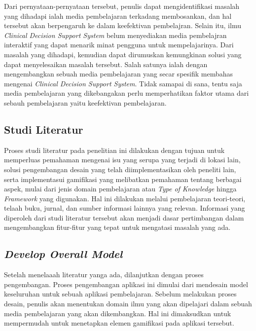Dari pernyataan-pernyataan tersebut, penulis dapat mengidentifikasi masalah yang dihadapi ialah media pembelajaran terkadang membosankan, dan hal tersebut akan berpengaruh ke dalam keefektivan pembelajran.
Selain itu, ilmu \textit{Clinical Decision Support System} belum menyediakan media pembelajran interaktif yang dapat menarik minat pengguna untuk mempelajarinya.
Dari masalah yang dihadapi, kemudian dapat dirumuskan kemungkinan solusi yang dapat menyelesaikan masalah tersebut. Salah satunya ialah dengan mengembangkan sebuah media pembelajaran yang secar spesifik membahas mengenai \textit{Clinical Decision Support System}.
Tidak samapai di sana, tentu saja media pembelajaran yang dikebangakan perlu memperhatikan faktor utama dari sebauh pembelajaran yaitu keefektivan pembelajaran.

\subsection{Studi Literatur}
Proses studi literatur pada penelitian ini dilakukan dengan tujuan untuk memperluas pemahaman mengenai isu yang serupa yang terjadi di lokasi lain, 
solusi pengembangan desain yang telah diimplementasikan oleh peneliti lain, serta implementasui gamifikasi yang melibatkan pemahaman tentang berbagai aspek, 
mulai dari jenis domain pembelajaran atau \textit{Type of Knowledge} hingga \textit{Framework} yang digunakan. 
Hal ini dilakukan melalui pembelajaran teori-teori, telaah buku, jurnal, dan sumber informasi lainnya yang relevan. 
Informasi yang diperoleh dari studi literatur tersebut akan menjadi dasar pertimbangan dalam mengembangkan fitur-fitur yang tepat untuk mengatasi masalah yang ada.
\subsection{\textit{Develop Overall Model}}
Setelah menelaaah literatur yanga ada, dilanjutkan dengan proses pengembangan. Proses pengembangan aplikasi ini dimulai dari mendesain model keseluruhan untuk sebuah aplikasi pembelajaran.
Sebelum melakukan proses desain, penulis akan menentukan domain ilmu yang akan dipelajari dalam sebuah media pembelajaran yang akan dikembangkan. Hal ini dimaksudkan untuk mempermudah untuk menetapkan elemen gamifikasi pada aplikasi tersebut.

